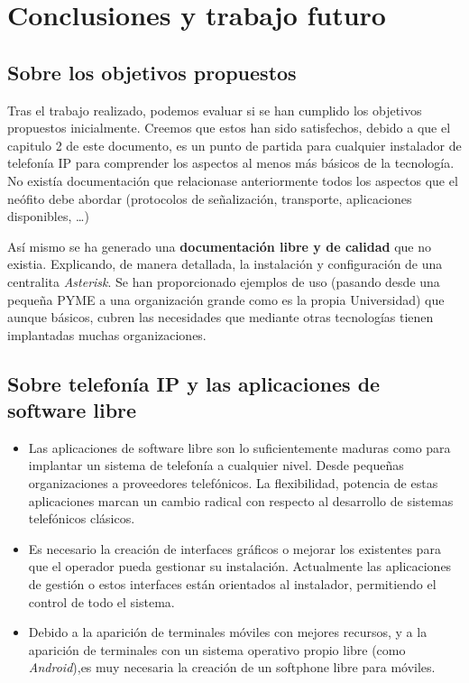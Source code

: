 \documentclass{scrartcl}
\begin{document}
\section{Conclusiones y trabajo futuro}
\label{cha:concl-y-trab}

\subsection*{Sobre los objetivos propuestos}

Tras el trabajo realizado, podemos evaluar si se han cumplido los objetivos propuestos inicialmente. Creemos que estos han sido satisfechos, debido a que el capitulo 2 de este documento, es un punto de partida para cualquier instalador de telefonía IP para comprender los aspectos al menos más básicos de la tecnología. No existía documentación que relacionase anteriormente todos los aspectos que el neófito debe abordar (protocolos de señalización, transporte, aplicaciones disponibles, \ldots)

Así mismo se ha generado una \textbf{ documentación libre y de calidad} que no existia. Explicando, de manera detallada, la instalación y configuración de una centralita \emph{Asterisk}. Se han proporcionado ejemplos de uso (pasando desde una pequeña PYME a una organización grande como es la propia Universidad) que aunque básicos, cubren las necesidades que mediante otras tecnologías tienen implantadas muchas organizaciones.

\subsection*{Sobre telefonía IP y las aplicaciones de software libre}


\begin{itemize}
\item Las aplicaciones de software libre son lo suficientemente maduras como para implantar un sistema de telefonía a cualquier nivel. Desde pequeñas organizaciones a proveedores telefónicos. La flexibilidad, potencia de estas aplicaciones marcan un cambio radical con respecto al desarrollo de sistemas telefónicos clásicos.
\item Es necesario la creación de interfaces gráficos o mejorar los existentes para que el operador pueda gestionar su instalación. Actualmente las aplicaciones de gestión o estos interfaces están orientados al instalador, permitiendo el control de todo el sistema.
\item Debido a la aparición de terminales móviles con mejores recursos, y a la aparición de terminales con un sistema operativo propio libre (como \emph{Android}),es muy necesaria la creación de un softphone libre para móviles.
\end{itemize}
\end{document}
